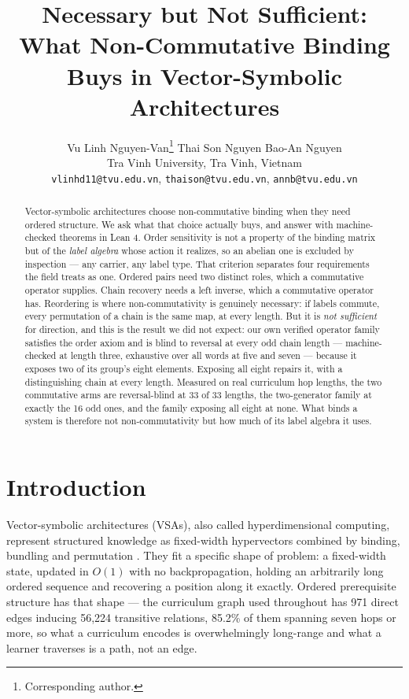 \documentclass[10pt]{article}
\title{\textbf{Necessary but Not Sufficient:\\ What Non-Commutative Binding Buys in Vector-Symbolic Architectures}}
\author{
  Vu Linh Nguyen-Van\thanks{Corresponding author.} \quad Thai Son Nguyen \quad Bao-An Nguyen \\
  \small Tra Vinh University, Tra Vinh, Vietnam \\
  \small \texttt{vlinhd11@tvu.edu.vn}, \texttt{thaison@tvu.edu.vn}, \texttt{annb@tvu.edu.vn}
}
\date{}
\begin{document}
\maketitle

\begin{abstract}
Vector-symbolic architectures choose non-commutative binding when they need ordered structure. We ask what that choice actually buys, and answer with machine-checked theorems in Lean 4. Order sensitivity is not a property of the binding matrix but of the \emph{label algebra} whose action it realizes, so an abelian one is excluded by inspection --- any carrier, any label type. That criterion separates four requirements the field treats as one. Ordered pairs need two distinct roles, which a commutative operator supplies. Chain recovery needs a left inverse, which a commutative operator has. Reordering is where non-commutativity is genuinely necessary: if labels commute, every permutation of a chain is the same map, at every length. But it is \emph{not sufficient} for direction, and this is the result we did not expect: our own verified operator family satisfies the order axiom and is blind to reversal at every odd chain length --- machine-checked at length three, exhaustive over all words at five and seven --- because it exposes two of its group's eight elements. Exposing all eight repairs it, with a distinguishing chain at every length. Measured on real curriculum hop lengths, the two commutative arms are reversal-blind at 33 of 33 lengths, the two-generator family at exactly the 16 odd ones, and the family exposing all eight at none. What binds a system is therefore not non-commutativity but how much of its label algebra it uses.
\end{abstract}

\section{Introduction}
\label{sec:intro}

Vector-symbolic architectures (VSAs), also called hyperdimensional computing, represent structured knowledge as fixed-width hypervectors combined by binding, bundling and permutation \citep{kanerva2009hyperdimensional,kleyko2022survey}. They fit a specific shape of problem: a fixed-width state, updated in $O(1)$ with no backpropagation, holding an arbitrarily long ordered sequence and recovering a position along it exactly. Ordered prerequisite structure has that shape --- the curriculum graph used throughout has 971 direct edges inducing 56{,}224 transitive relations, 85.2\% of them spanning seven hops or more, so what a curriculum encodes is overwhelmingly long-range and what a learner traverses is a path, not an edge.
\end{document}
